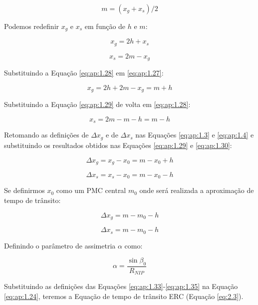 \begin{equation}
 \label{eq:ap:1.26}
 m=(x_g + x_s)/2
\end{equation}

Podemos redefinir $x_g$ e $x_s$ em função de $h$ e $m$:

\begin{equation}
 \label{eq:ap:1.27}
 x_g = 2h + x_s
\end{equation}

\begin{equation}
 \label{eq:ap:1.28}
 x_s = 2m - x_g
\end{equation}

Substituindo a Equação \ref{eq:ap:1.28} em \ref{eq:ap:1.27}:

\begin{equation}
 \label{eq:ap:1.29}
 x_g = 2h + 2m - x_g = m + h
\end{equation}

Substituindo a Equação \ref{eq:ap:1.29} de volta em \ref{eq:ap:1.28}:

\begin{equation}
 \label{eq:ap:1.30}
 x_s = 2m - m -h = m - h
\end{equation}

Retomando as definições de $\Delta x_g$ e de $\Delta x_s$ nas Equações \ref{eq:ap:1.3} e \ref{eq:ap:1.4}
e substituindo os resultados obtidos nas Equações \ref{eq:ap:1.29} e \ref{eq:ap:1.30}:

\begin{equation}
 \label{eq:ap:1.31}
 \Delta x_g = x_g - x_0 = m - x_0 + h
\end{equation}

\begin{equation}
 \label{eq:ap:1.32}
 \Delta x_s = x_s - x_0 = m - x_0 - h
\end{equation}

Se definirmos $x_0$ como um PMC central $m_0$ onde será realizada a aproximação de tempo de trânsito:

\begin{equation}
 \label{eq:ap:1.33}
 \Delta x_g = m - m_0 - h
\end{equation}

\begin{equation}
 \label{eq:ap:1.34}
 \Delta x_s = m - m_0 - h
\end{equation}

Definindo o parâmetro de assimetria $\alpha$ como:

\begin{equation}
 \label{eq:ap:1.35}
 \alpha = \frac{\sin \beta_0}{R_{NIP}}
\end{equation}

Substituindo as definições das Equações \ref{eq:ap:1.33}-\ref{eq:ap:1.35} na
Equação \ref{eq:ap:1.24}, teremos a Equação de tempo de trânsito ERC (Equação \ref{eq:2.3}).
